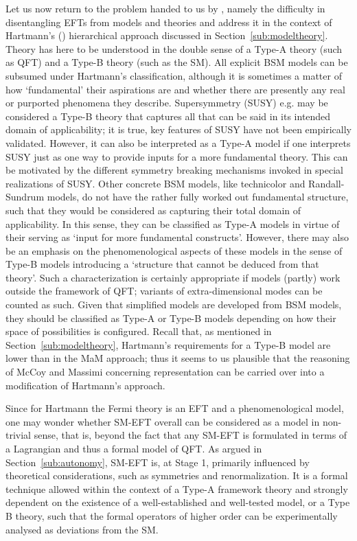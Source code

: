 Let us now return to the problem handed to us by \citet{hartmann2001}, namely the difficulty in disentangling EFTs from models and theories and address it in the context of Hartmann's (\citeyear{hartmann95}) hierarchical approach discussed in Section~\ref{sub:modeltheory}. 
Theory has here to be understood in the double sense of a Type-A theory (such as QFT) and a Type-B theory (such as the SM). 
All explicit BSM models can be subsumed under Hartmann's classification, although it is sometimes a matter of how `fundamental' their aspirations are and whether there are presently any real or purported phenomena they describe.
Supersymmetry (SUSY) e.g. may be considered a Type-B theory %
that captures all that can be said in its intended domain of applicability; it is true, key features of SUSY have not been empirically validated. 
However, it can also be interpreted as a Type-A model if one interprets SUSY just as one way to provide inputs for a more fundamental theory. 
This can be motivated by the different symmetry breaking mechanisms invoked in special realizations of SUSY. 
Other concrete BSM models, like technicolor and Randall-Sundrum models, do not have the rather fully worked out fundamental structure, such that they would be considered as capturing their total domain of applicability. 
In this sense, they can be classified as Type-A models in virtue of their serving as `input for more fundamental constructs'. 
However, there may also be an emphasis on the phenomenological aspects of these models in the sense of Type-B models introducing a `structure that cannot be deduced from that theory'. 
Such a characterization is certainly appropriate if models (partly) work outside the framework of QFT; variants of extra-dimensional modes can be counted as such. 
Given that simplified models are developed from BSM models, they should be classified as Type-A or Type-B models depending on how their space of possibilities is configured.
Recall that, as mentioned in Section~\ref{sub:modeltheory}, Hartmann's requirements for a Type-B model are lower than in the MaM approach; thus it seems to us plausible that the reasoning of McCoy and Massimi concerning representation can be carried over into a modification of Hartmann's approach.

Since for Hartmann the Fermi theory is an EFT and a phenomenological model, one may wonder whether SM-EFT overall can be considered as a model in non-trivial sense, that is, beyond the fact that any SM-EFT is formulated in terms of a Lagrangian and thus a formal model of QFT.
As argued in Section~\ref{sub:autonomy}, SM-EFT is, at Stage 1, primarily influenced by theoretical considerations, such as symmetries and renormalization. 
It is a formal technique allowed within the context of a Type-A framework theory and strongly dependent on the existence of a well-established and well-tested model, or a Type B theory, such that the formal operators of higher order can be experimentally analysed as deviations from the SM. 

